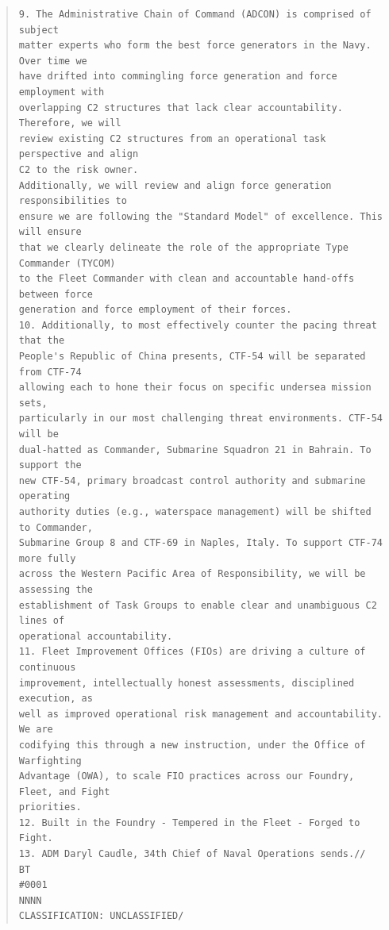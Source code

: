 \documentclass[../main.tex]{subfiles}
\begin{document}
\begin{quote}
\begin{verbatim}
9. The Administrative Chain of Command (ADCON) is comprised of subject
matter experts who form the best force generators in the Navy. Over time we
have drifted into commingling force generation and force employment with
overlapping C2 structures that lack clear accountability. Therefore, we will
review existing C2 structures from an operational task perspective and align
C2 to the risk owner.
Additionally, we will review and align force generation responsibilities to
ensure we are following the "Standard Model" of excellence. This will ensure
that we clearly delineate the role of the appropriate Type Commander (TYCOM)
to the Fleet Commander with clean and accountable hand-offs between force
generation and force employment of their forces.
10. Additionally, to most effectively counter the pacing threat that the
People's Republic of China presents, CTF-54 will be separated from CTF-74
allowing each to hone their focus on specific undersea mission sets,
particularly in our most challenging threat environments. CTF-54 will be
dual-hatted as Commander, Submarine Squadron 21 in Bahrain. To support the
new CTF-54, primary broadcast control authority and submarine operating
authority duties (e.g., waterspace management) will be shifted to Commander,
Submarine Group 8 and CTF-69 in Naples, Italy. To support CTF-74 more fully
across the Western Pacific Area of Responsibility, we will be assessing the
establishment of Task Groups to enable clear and unambiguous C2 lines of
operational accountability.
11. Fleet Improvement Offices (FIOs) are driving a culture of continuous
improvement, intellectually honest assessments, disciplined execution, as
well as improved operational risk management and accountability. We are
codifying this through a new instruction, under the Office of Warfighting
Advantage (OWA), to scale FIO practices across our Foundry, Fleet, and Fight
priorities.
12. Built in the Foundry - Tempered in the Fleet - Forged to Fight.
13. ADM Daryl Caudle, 34th Chief of Naval Operations sends.//
BT
#0001
NNNN
CLASSIFICATION: UNCLASSIFIED/
\end{verbatim}
\end{quote}
\end{document}
